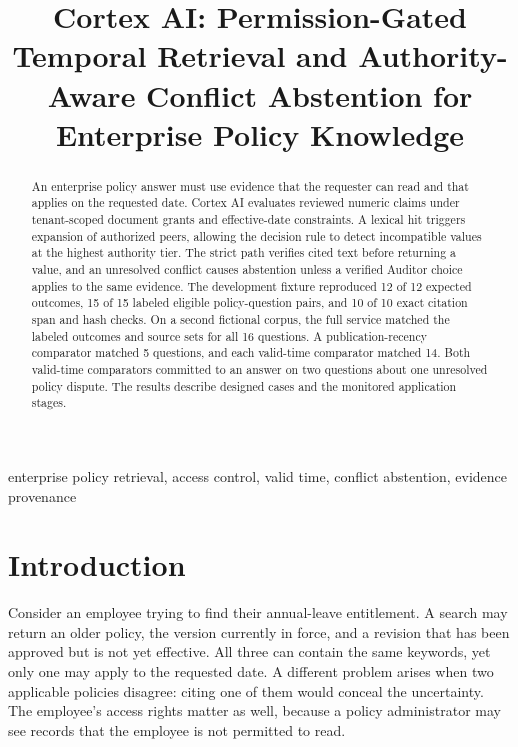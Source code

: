 \documentclass[conference]{IEEEtran}
\begin{document}
\title{Cortex AI: Permission-Gated Temporal Retrieval and
Authority-Aware Conflict Abstention for Enterprise Policy Knowledge}
\author{
}
\maketitle
\begin{abstract}
An enterprise policy answer must use evidence that the requester can
read and that applies on the requested date. Cortex AI evaluates
reviewed numeric claims under tenant-scoped document grants and
effective-date constraints. A lexical hit triggers expansion of
authorized peers, allowing the decision rule to detect incompatible
values at the highest authority tier. The strict path verifies cited
text before returning a value, and an unresolved conflict causes
abstention unless a verified Auditor choice applies to the same
evidence. The development fixture reproduced 12 of 12 expected outcomes,
15 of 15 labeled eligible policy-question pairs, and 10 of 10 exact
citation span and hash checks. On a second fictional corpus, the full
service matched the labeled outcomes and source sets for all 16
questions. A publication-recency comparator matched 5 questions, and
each valid-time comparator matched 14. Both valid-time comparators
committed to an answer on two questions about one unresolved policy
dispute. The results describe designed cases and the monitored
application stages.
\end{abstract}
\begin{IEEEkeywords}
enterprise policy retrieval, access control, valid time, conflict
abstention, evidence provenance
\end{IEEEkeywords}
\section{Introduction}\label{introduction}

Consider an employee trying to find their annual-leave entitlement. A
search may return an older policy, the version currently in force, and a
revision that has been approved but is not yet effective. All three can
contain the same keywords, yet only one may apply to the requested date.
A different problem arises when two applicable policies disagree: citing
one of them would conceal the uncertainty. The employee's access rights
matter as well, because a policy administrator may see records that the
employee is not permitted to read.
\end{document}

